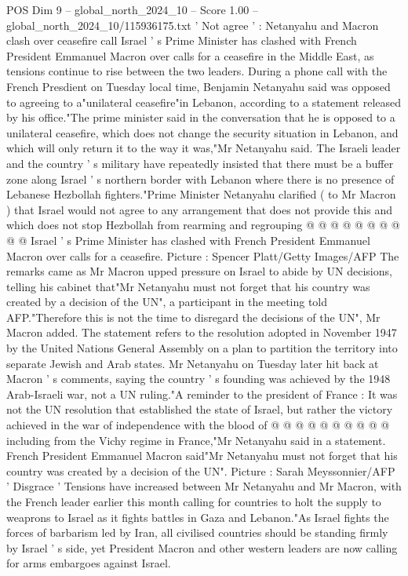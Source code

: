 \begin{textsample}{POS Dim 9 – global\_north\_2024\_10 – Score 1.00 – global\_north\_2024\_10/115936175.txt}  \label{ex:f9_pos_229}
' Not agree ' : Netanyahu and Macron clash over ceasefire call Israel ' s Prime Minister has clashed with French President Emmanuel Macron over calls for a ceasefire in the Middle East, as tensions continue to rise between the two leaders.
During a phone call with the French Presdient on Tuesday local time, Benjamin Netanyahu said was opposed to agreeing to a"unilateral ceasefire"in Lebanon, according to a statement released by his office."The prime minister said in the conversation that he is opposed to a unilateral ceasefire, which does not change the security situation in Lebanon, and which will only return it to the way it was,"Mr Netanyahu said.
The Israeli leader and the country ' s military have repeatedly insisted that there must be a buffer zone along Israel ' s northern border with Lebanon where there is no presence of Lebanese Hezbollah fighters."Prime Minister Netanyahu clarified ( to Mr Macron ) that Israel would not agree to any arrangement that does not provide this and which does not stop Hezbollah from rearming and regrouping @ @ @ @ @ @ @ @ @ @ Israel ' s Prime Minister has clashed with French President Emmanuel Macron over calls for a ceasefire.
Picture : Spencer Platt/Getty Images/AFP The remarks came as Mr Macron upped pressure on Israel to abide by UN decisions, telling his cabinet that"Mr Netanyahu must not forget that his country was created by a decision of the UN", a participant in the meeting told AFP."Therefore this is not the time to disregard the decisions of the UN", Mr Macron added.
The statement refers to the resolution adopted in November 1947 by the United Nations General Assembly on a plan to partition the territory into separate Jewish and Arab states.
Mr Netanyahu on Tuesday later hit back at Macron ' s comments, saying the country ' s founding was achieved by the 1948 Arab-Israeli war, not a UN ruling."A reminder to the president of France : It was not the UN resolution that established the state of Israel, but rather the victory achieved in the war of independence with the blood of @ @ @ @ @ @ @ @ @ @ including from the Vichy regime in France,"Mr Netanyahu said in a statement.
French President Emmanuel Macron said"Mr Netanyahu must not forget that his country was created by a decision of the UN".
Picture : Sarah Meyssonnier/AFP ' Disgrace ' Tensions have increased between Mr Netanyahu and Mr Macron, with the French leader earlier this month calling for countries to holt the supply to weaprons to Israel as it fights battles in Gaza and Lebanon."As Israel fights the forces of barbarism led by Iran, all civilised countries should be standing firmly by Israel ' s side, yet President Macron and other western leaders are now calling for arms embargoes against Israel.

\end{textsample}
